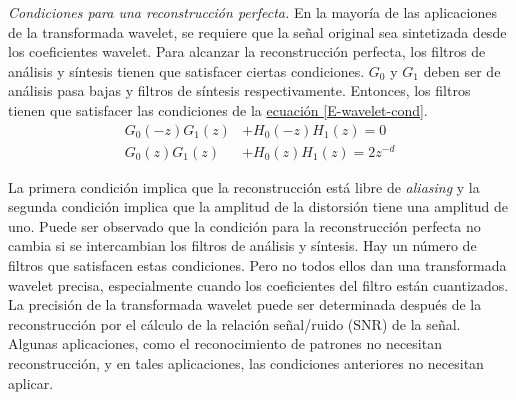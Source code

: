 \documentclass[11pt,lettersize]{article} %
\newcommand{\ecuacion}[1]{\hyperref[{#1}]{ecuación \ref*{#1}}}
\begin{document}
\textit{Condiciones para una reconstrucción perfecta.}
En la mayoría de las aplicaciones de la transformada wavelet, se requiere que la señal original sea sintetizada desde los coeficientes wavelet. Para alcanzar la reconstrucción perfecta, los filtros de análisis y síntesis tienen que satisfacer ciertas condiciones. $G_0$ y $G_1$ deben ser de análisis pasa bajas y filtros de síntesis respectivamente. Entonces, los filtros tienen que satisfacer las condiciones de la \ecuacion{E-wavelet-cond}.
\begin{equation}
	\begin{aligned}
		G_0(-z)G_1(z) &+ H_0(-z)H_1(z) = 0 \\
		G_0(z)G_1(z) &+ H_0(z)H_1(z) = 2z^{-d}
		\label{E-wavelet-cond}
	\end{aligned}
\end{equation}

La primera condición implica que la reconstrucción está libre de \textit{aliasing} y la segunda condición implica que la amplitud de la distorsión tiene una amplitud de uno. Puede ser observado que la condición para la reconstrucción perfecta no cambia si se intercambian los filtros de análisis y síntesis. Hay un número de filtros que satisfacen estas condiciones. Pero no todos ellos dan una transformada wavelet precisa, especialmente cuando los coeficientes del filtro están cuantizados. La precisión de la transformada wavelet puede ser determinada después de la reconstrucción por el cálculo de la relación señal/ruido (SNR) de la señal. Algunas aplicaciones, como el reconocimiento de patrones no necesitan reconstrucción, y en tales aplicaciones, las condiciones
anteriores no necesitan aplicar.\\
\end{document}
